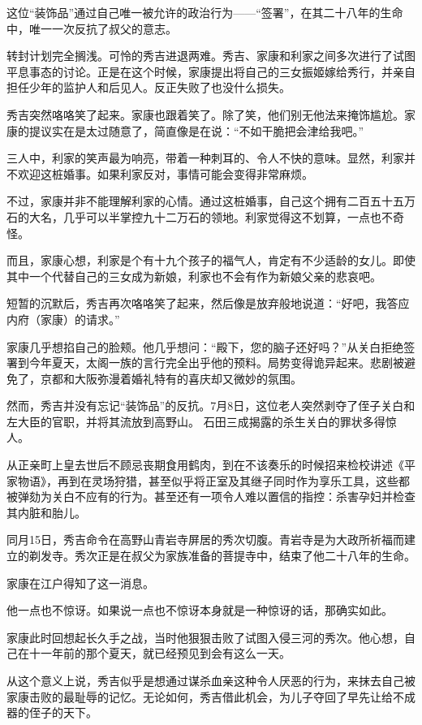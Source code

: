 \documentclass[
]{article}
\begin{document}
这位``装饰品''通过自己唯一被允许的政治行为------``签署''，在其二十八年的生命中，唯一一次反抗了叔父的意志。

转封计划完全搁浅。可怜的秀吉进退两难。秀吉、家康和利家之间多次进行了试图平息事态的讨论。正是在这个时候，家康提出将自己的三女振姬嫁给秀行，并亲自担任少年的监护人和后见人。反正失败了也没什么损失。

秀吉突然咯咯笑了起来。家康也跟着笑了。除了笑，他们别无他法来掩饰尴尬。家康的提议实在是太过随意了，简直像是在说：``不如干脆把会津给我吧。''

三人中，利家的笑声最为响亮，带着一种刺耳的、令人不快的意味。显然，利家并不欢迎这桩婚事。如果利家反对，事情可能会变得非常麻烦。

不过，家康并非不能理解利家的心情。通过这桩婚事，自己这个拥有二百五十五万石的大名，几乎可以半掌控九十二万石的领地。利家觉得这不划算，一点也不奇怪。

而且，家康心想，利家是个有十九个孩子的福气人，肯定有不少适龄的女儿。即使其中一个代替自己的三女成为新娘，利家也不会有作为新娘父亲的悲哀吧。

短暂的沉默后，秀吉再次咯咯笑了起来，然后像是放弃般地说道：``好吧，我答应内府（家康）的请求。''

家康几乎想掐自己的脸颊。他几乎想问：``殿下，您的脑子还好吗？''从关白拒绝签署到今年夏天，太阁一族的言行完全出乎他的预料。局势变得诡异起来。悲剧被避免了，京都和大阪弥漫着婚礼特有的喜庆却又微妙的氛围。

然而，秀吉并没有忘记``装饰品''的反抗。7月8日，这位老人突然剥夺了侄子关白和左大臣的官职，并将其流放到高野山。
石田三成揭露的杀生关白的罪状多得惊人。

从正亲町上皇去世后不顾忌丧期食用鹤肉，到在不该奏乐的时候招来检校讲述《平家物语》，再到在灵场狩猎，甚至似乎将正室及其继子同时作为享乐工具，这些都被弹劾为关白不应有的行为。甚至还有一项令人难以置信的指控：杀害孕妇并检查其内脏和胎儿。

同月15日，秀吉命令在高野山青岩寺屏居的秀次切腹。青岩寺是为大政所祈福而建立的剃发寺。秀次正是在叔父为家族准备的菩提寺中，结束了他二十八年的生命。

家康在江户得知了这一消息。

他一点也不惊讶。如果说一点也不惊讶本身就是一种惊讶的话，那确实如此。

家康此时回想起长久手之战，当时他狠狠击败了试图入侵三河的秀次。他心想，自己在十一年前的那个夏天，就已经预见到会有这么一天。

从这个意义上说，秀吉似乎是想通过谋杀血亲这种令人厌恶的行为，来抹去自己被家康击败的最耻辱的记忆。无论如何，秀吉借此机会，为儿子夺回了早先让给不成器的侄子的天下。
\end{document}
